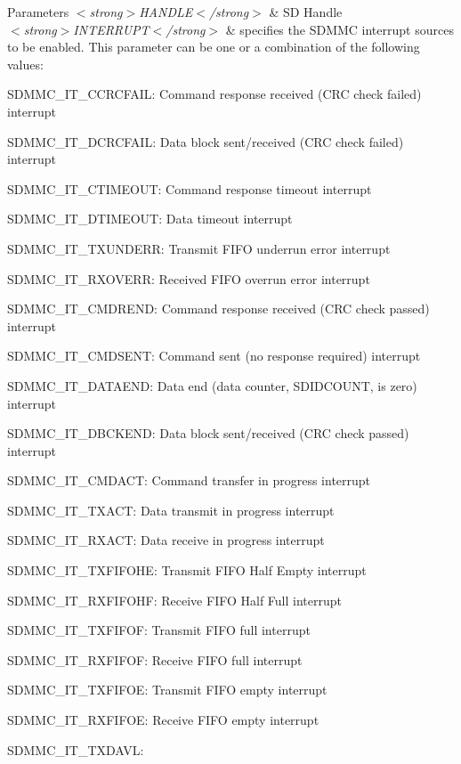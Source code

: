 \begin{DoxyParams}{Parameters}
{\em $<$strong$>$\+H\+A\+N\+D\+L\+E$<$/strong$>$} & SD Handle\\
\hline
{\em $<$strong$>$\+I\+N\+T\+E\+R\+R\+U\+P\+T$<$/strong$>$} & specifies the S\+D\+M\+MC interrupt sources to be enabled. This parameter can be one or a combination of the following values\+: \begin{DoxyItemize}
\item S\+D\+M\+M\+C\+\_\+\+I\+T\+\_\+\+C\+C\+R\+C\+F\+A\+IL\+: Command response received (C\+RC check failed) interrupt \item S\+D\+M\+M\+C\+\_\+\+I\+T\+\_\+\+D\+C\+R\+C\+F\+A\+IL\+: Data block sent/received (C\+RC check failed) interrupt \item S\+D\+M\+M\+C\+\_\+\+I\+T\+\_\+\+C\+T\+I\+M\+E\+O\+UT\+: Command response timeout interrupt \item S\+D\+M\+M\+C\+\_\+\+I\+T\+\_\+\+D\+T\+I\+M\+E\+O\+UT\+: Data timeout interrupt \item S\+D\+M\+M\+C\+\_\+\+I\+T\+\_\+\+T\+X\+U\+N\+D\+E\+RR\+: Transmit F\+I\+FO underrun error interrupt \item S\+D\+M\+M\+C\+\_\+\+I\+T\+\_\+\+R\+X\+O\+V\+E\+RR\+: Received F\+I\+FO overrun error interrupt \item S\+D\+M\+M\+C\+\_\+\+I\+T\+\_\+\+C\+M\+D\+R\+E\+ND\+: Command response received (C\+RC check passed) interrupt \item S\+D\+M\+M\+C\+\_\+\+I\+T\+\_\+\+C\+M\+D\+S\+E\+NT\+: Command sent (no response required) interrupt \item S\+D\+M\+M\+C\+\_\+\+I\+T\+\_\+\+D\+A\+T\+A\+E\+ND\+: Data end (data counter, S\+D\+I\+D\+C\+O\+U\+NT, is zero) interrupt \item S\+D\+M\+M\+C\+\_\+\+I\+T\+\_\+\+D\+B\+C\+K\+E\+ND\+: Data block sent/received (C\+RC check passed) interrupt \item S\+D\+M\+M\+C\+\_\+\+I\+T\+\_\+\+C\+M\+D\+A\+CT\+: Command transfer in progress interrupt \item S\+D\+M\+M\+C\+\_\+\+I\+T\+\_\+\+T\+X\+A\+CT\+: Data transmit in progress interrupt \item S\+D\+M\+M\+C\+\_\+\+I\+T\+\_\+\+R\+X\+A\+CT\+: Data receive in progress interrupt \item S\+D\+M\+M\+C\+\_\+\+I\+T\+\_\+\+T\+X\+F\+I\+F\+O\+HE\+: Transmit F\+I\+FO Half Empty interrupt \item S\+D\+M\+M\+C\+\_\+\+I\+T\+\_\+\+R\+X\+F\+I\+F\+O\+HF\+: Receive F\+I\+FO Half Full interrupt \item S\+D\+M\+M\+C\+\_\+\+I\+T\+\_\+\+T\+X\+F\+I\+F\+OF\+: Transmit F\+I\+FO full interrupt \item S\+D\+M\+M\+C\+\_\+\+I\+T\+\_\+\+R\+X\+F\+I\+F\+OF\+: Receive F\+I\+FO full interrupt \item S\+D\+M\+M\+C\+\_\+\+I\+T\+\_\+\+T\+X\+F\+I\+F\+OE\+: Transmit F\+I\+FO empty interrupt \item S\+D\+M\+M\+C\+\_\+\+I\+T\+\_\+\+R\+X\+F\+I\+F\+OE\+: Receive F\+I\+FO empty interrupt \item S\+D\+M\+M\+C\+\_\+\+I\+T\+\_\+\+T\+X\+D\+A\+VL\+: 
\end{DoxyItemize}
\end{DoxyParams}
